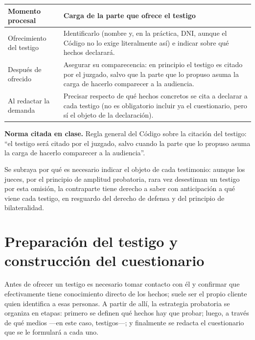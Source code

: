 \documentclass[12pt,oneside]{book}
\begin{document}
\begin{table}[H]
\centering
\begin{tabularx}{\textwidth}{
    >{\raggedright\arraybackslash}p{}
    >{\raggedright\arraybackslash}X
}
\toprule
\textbf{Momento procesal} & \textbf{Carga de la parte que ofrece el testigo} \\
\midrule
Ofrecimiento del testigo &
Identificarlo (nombre y, en la práctica, DNI, aunque el Código no lo exige literalmente así) e indicar sobre qué hechos declarará. \\
Después de ofrecido &
Asegurar su comparecencia: en principio el testigo es citado por el juzgado, salvo que la parte que lo propuso asuma la carga de hacerlo comparecer a la audiencia. \\
Al redactar la demanda &
Precisar respecto de qué hechos concretos se cita a declarar a cada testigo (no es obligatorio incluir ya el cuestionario, pero sí el objeto de la declaración). \\
\bottomrule
\end{tabularx}
\end{table}

\begin{important}
\textbf{Norma citada en clase.} Regla general del Código sobre la citación del testigo: ``el testigo será citado por el juzgado, salvo cuando la parte que lo propuso asuma la carga de hacerlo comparecer a la audiencia''.
\end{important}

Se subraya por qué es necesario indicar el objeto de cada testimonio: aunque los jueces, por el principio de amplitud probatoria, rara vez desestiman un testigo por esta omisión, la contraparte tiene derecho a saber con anticipación a qué viene cada testigo, en resguardo del derecho de defensa y del principio de bilateralidad.

\section{Preparación del testigo y construcción del cuestionario}

Antes de ofrecer un testigo es necesario tomar contacto con él y confirmar que efectivamente tiene conocimiento directo de los hechos; suele ser el propio cliente quien identifica a esas personas. A partir de allí, la estrategia probatoria se organiza en etapas: primero se definen qué hechos hay que probar; luego, a través de qué medios ---en este caso, testigos---; y finalmente se redacta el cuestionario que se le formulará a cada uno.
\end{document}
